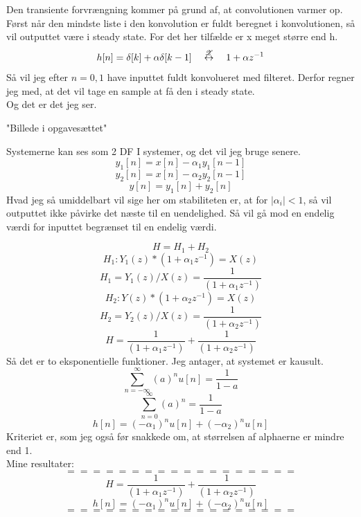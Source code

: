 \begin{EksamensOpgaver}
\begin{Eksamenssæt}
\begin{eksamensOpgave}
            \begin{UnderOpgave}
                Den transiente forvrængning kommer på grund af, at convolutionen varmer op. Først når den mindste liste i den konvolution er fuldt beregnet i konvolutionen, så vil outputtet være i steady state.
                For det her tilfælde er x meget større end h. 
                \[h[n] = \delta[k] + \alpha \delta[k - 1] \transformation{Z} 1 + \alpha z^{-1}\]
                Så vil jeg efter $n = 0, 1$ have inputtet fuldt konvolueret med filteret. 
                Derfor regner jeg med, at det vil tage en sample at få den i steady state.
                \\
                Og det er det jeg ser. 
            \end{UnderOpgave}
        \end{eksamensOpgave}
        \begin{eksamensOpgave}
            "Billede i opgavesættet"
            \begin{UnderOpgave}
                Systemerne kan ses som 2 DF I systemer, og det vil jeg bruge senere. 
                \[y_1[n] = x[n] - \alpha_1y_1[n - 1]\]
                \[y_2[n] = x[n] - \alpha_2y_2[n - 1]\]
                \[y[n] = y_1[n] + y_2[n]\]
                Hvad jeg så umiddelbart vil sige her om stabiliteten er, at for $|\alpha_i| < 1$, så vil outputtet ikke påvirke det næste til en uendelighed. 
                Så vil gå mod en endelig værdi for inputtet begrænset til en endelig værdi. 
            \end{UnderOpgave}
            \begin{UnderOpgave}
                \[H = H_1 + H_2\]
                \[H_1 : Y_1(z)*(1 + \alpha_1z^{-1}) = X(z)\]
                \[H_1 = Y_1(z)/X(z) = \frac{1}{(1 + \alpha_1z^{-1})}\]
                \[H_2 : Y(z)*(1 + \alpha_2z^{-1}) = X(z)\]
                \[H_2 = Y_2(z)/X(z) = \frac{1}{(1 + \alpha_2z^{-1})}\]
                \[H = \frac{1}{(1 + \alpha_1z^{-1})} + \frac{1}{(1 + \alpha_2z^{-1})}\]
                Så det er to eksponentielle funktioner. Jeg antager, at systemet er kausult. 
                \[\sum_{n = -\infty}^{\infty}(a)^nu[n] = \frac{1}{1 - a}\]
                \[\sum_{n = 0}^{\infty}(a)^n = \frac{1}{1 - a}\]
                \[h[n] = (-\alpha_1)^nu[n] + (-\alpha_2)^nu[n]\]
                Kriteriet er, som jeg også før snakkede om, at størrelsen af alphaerne er mindre end 1. \\
                Mine resultater: 
                \[==================\]
                \[H = \frac{1}{(1 + \alpha_1z^{-1})} + \frac{1}{(1 + \alpha_2z^{-1})}\]
                \[h[n] = (-\alpha_1)^nu[n] + (-\alpha_2)^nu[n]\]
                \[==================\]
                

\end{UnderOpgave}
\end{eksamensOpgave}
\end{Eksamenssæt}
\end{EksamensOpgaver}
